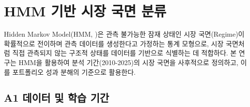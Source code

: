 \documentclass{article}
\begin{document}





\appendix
\renewcommand{\thesection}{부록 \Alph{section}}
\renewcommand{\thefigure}{A.\arabic{figure}}
\renewcommand{\thetable}{A.\arabic{table}}
\setcounter{figure}{0}
\setcounter{table}{0}

\section{HMM 기반 시장 국면 분류}\label{app:hmm}

Hidden Markov Model(HMM, \citealp{hamilton1989new})은 관측 불가능한 잠재 상태인 시장 국면(Regime)이 확률적으로 전이하며 관측 데이터를 생성한다고 가정하는 통계 모형으로, 시장 국면처럼 직접 관측되지 않는 구조적 상태를 데이터를 기반으로 식별하는 데 적합하다. 본 연구는 HMM을 활용하여 분석 기간(2010-2025)의 시장 국면을 사후적으로 정의하고, 이를 포트폴리오 성과 분해의 기준으로 활용한다.

\subsection*{A1 데이터 및 학습 기간}
\end{document}
